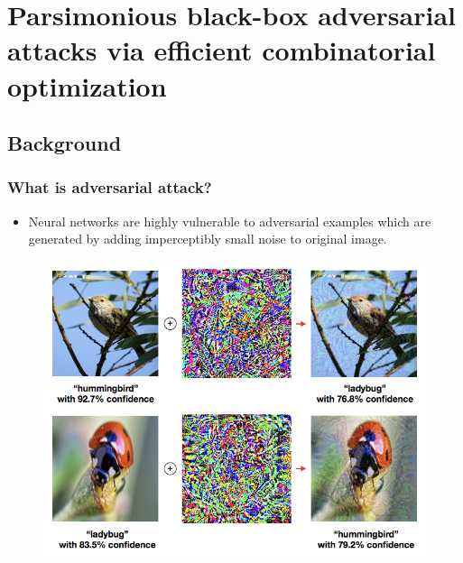 \documentclass[10pt,mathserif]{beamer}
\begin{document}
\section{Parsimonious black-box adversarial attacks via efficient combinatorial optimization}

\subsection{Background} %

\begin{frame}
\frametitle{What is adversarial attack?}
\begin{itemize}\itemsep=12pt
    \item Neural networks are highly vulnerable to adversarial examples which are generated by adding imperceptibly small noise to original image.
\end{itemize}
\begin{figure}
    \centering
    \includegraphics[scale=0.30]{figures/adversarial_attack.png}
    \label{fig:adversarial_attack}
\end{figure}
\vspace{-3em}
\end{frame}
\end{document}
